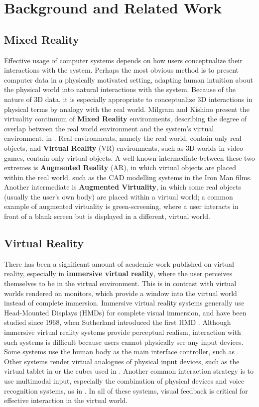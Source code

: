\documentclass[pageno]{jpaper}
\begin{document}
\section{Background and Related Work}
\label{sec:background}
\subsection{Mixed Reality}
Effective usage of computer systems depends on how users conceptualize their interactions with the system.
Perhaps the most obvious method is to present computer data in a physically motivated setting, adapting
human intuition about the physical world into natural interactions with the system. Because of the nature of 3D data,
it is especially appropriate to conceptualize 3D interactions in physical terms by analogy with the real world. Milgram and Kishino present
the virtuality continuum of {\bf Mixed Reality} environments, describing the degree of overlap between the
real world environment and the system's virtual environment, in \cite{milgram1994taxonomy}. Real environments, namely
the real world, contain only real objects, and {\bf Virtual Reality} (VR) environments, such as 3D worlds in video games, contain only
virtual objects. A well-known intermediate between these two extremes is {\bf Augmented Reality} (AR), in which virtual
objects are placed within the real world. such as the CAD modelling systems in the Iron Man films. Another intermediate is
{\bf Augmented Virtuality}, in which some real objects (usually the user's own body) are placed within a virtual world; a common
example of augmented virtuality is green-screening, where a user interacts in front of a blank screen but is displayed in a
different, virtual world.

\subsection{Virtual Reality}
There has been a significant amount of academic work published on virtual reality, especially
in {\bf immersive virtual reality}, where the user perceives themselves to be in the virtual environment. This is in
contrast with virtual worlds rendered on monitors, which provide a window into the virtual world instead of complete immersion.
Immersive
virtual reality systems generally use Head-Mounted Displays (HMDs) for complete visual immersion, and have been studied
since 1968, when Sutherland introduced the first HMD \cite{sutherland1968head}. Although immersive virtual reality
systems provide perceptual realism, interaction with such systems is difficult because users cannot physically see any input devices.
Some systems use the human body as the main interface controller, such as \cite{laviola1999whole, laviola1999flex}. Other systems render
virtual analogues of physical input devices, such as the virtual tablet in \cite{poupyrev1998virtual} or the cubes used in \cite{mine1997exploiting}.
Another common interaction strategy is to use multimodal input, especially the combination of physical devices and voice recognition systems, as in \cite{bolt1980put}.
In all of these systems, visual feedback is critical for effective interaction in the virtual world.
\end{document}

